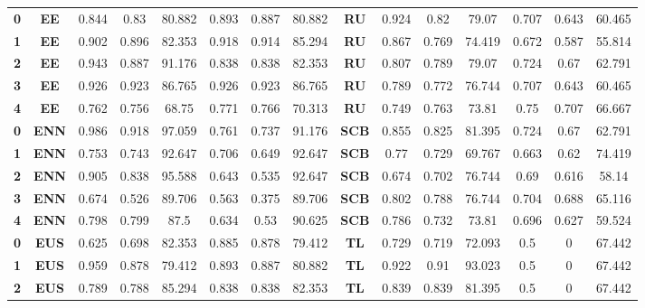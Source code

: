 {{\begin{tabular}{c|c|cccccc|ccccccc}
\textbf{0} & \textbf{EE} & 0.844 & 0.83  & 80.882 & 0.893 & 0.887 & 80.882 & \multicolumn{1}{c|}{\textbf{RU}} & 0.924 & 0.82  & 79.07 & 0.707 & 0.643 & 60.465 \\
\textbf{1} & \textbf{EE} & 0.902 & 0.896 & 82.353 & 0.918 & 0.914 & 85.294 & \multicolumn{1}{c|}{\textbf{RU}} & 0.867 & 0.769 & 74.419 & 0.672 & 0.587 & 55.814 \\
\textbf{2} & \textbf{EE} & 0.943 & 0.887 & 91.176 & 0.838 & 0.838 & 82.353 & \multicolumn{1}{c|}{\textbf{RU}} & 0.807 & 0.789 & 79.07 & 0.724 & 0.67  & 62.791 \\
\textbf{3} & \textbf{EE} & 0.926 & 0.923 & 86.765 & 0.926 & 0.923 & 86.765 & \multicolumn{1}{c|}{\textbf{RU}} & 0.789 & 0.772 & 76.744 & 0.707 & 0.643 & 60.465 \\
\textbf{4} & \textbf{EE} & 0.762 & 0.756 & 68.75 & 0.771 & 0.766 & 70.313 & \multicolumn{1}{c|}{\textbf{RU}} & 0.749 & 0.763 & 73.81 & 0.75  & 0.707 & 66.667 \\
\textbf{0} & \textbf{ENN} & 0.986 & 0.918 & 97.059 & 0.761 & 0.737 & 91.176 & \multicolumn{1}{c|}{\textbf{SCB}} & 0.855 & 0.825 & 81.395 & 0.724 & 0.67  & 62.791 \\
\textbf{1} & \textbf{ENN} & 0.753 & 0.743 & 92.647 & 0.706 & 0.649 & 92.647 & \multicolumn{1}{c|}{\textbf{SCB}} & 0.77  & 0.729 & 69.767 & 0.663 & 0.62  & 74.419 \\
\textbf{2} & \textbf{ENN} & 0.905 & 0.838 & 95.588 & 0.643 & 0.535 & 92.647 & \multicolumn{1}{c|}{\textbf{SCB}} & 0.674 & 0.702 & 76.744 & 0.69  & 0.616 & 58.14 \\
\textbf{3} & \textbf{ENN} & 0.674 & 0.526 & 89.706 & 0.563 & 0.375 & 89.706 & \multicolumn{1}{c|}{\textbf{SCB}} & 0.802 & 0.788 & 76.744 & 0.704 & 0.688 & 65.116 \\
\textbf{4} & \textbf{ENN} & 0.798 & 0.799 & 87.5  & 0.634 & 0.53  & 90.625 & \multicolumn{1}{c|}{\textbf{SCB}} & 0.786 & 0.732 & 73.81 & 0.696 & 0.627 & 59.524 \\
\textbf{0} & \textbf{EUS} & 0.625 & 0.698 & 82.353 & 0.885 & 0.878 & 79.412 & \multicolumn{1}{c|}{\textbf{TL}} & 0.729 & 0.719 & 72.093 & 0.5   & 0     & 67.442 \\
\textbf{1} & \textbf{EUS} & 0.959 & 0.878 & 79.412 & 0.893 & 0.887 & 80.882 & \multicolumn{1}{c|}{\textbf{TL}} & 0.922 & 0.91  & 93.023 & 0.5   & 0     & 67.442 \\
\textbf{2} & \textbf{EUS} & 0.789 & 0.788 & 85.294 & 0.838 & 0.838 & 82.353 & \multicolumn{1}{c|}{\textbf{TL}} & 0.839 & 0.839 & 81.395 & 0.5   & 0     & 67.442 \\

\end{tabular}}}
